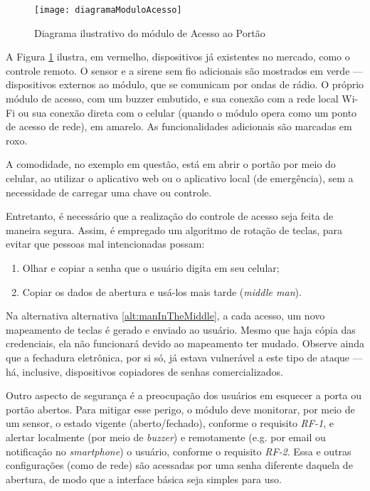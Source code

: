 \begin{figure}[H]
	\centering
	\caption{Diagrama ilustrativo do módulo de Acesso ao Portão}
  \texttt{[image: diagramaModuloAcesso]}
\label{fig:diagramaModuloAcesso}
\end{figure}

A Figura \ref{fig:diagramaModuloAcesso} ilustra, em vermelho, dispositivos já existentes no mercado, como o controle remoto. O sensor e a sirene sem fio adicionais são mostrados em verde --- dispositivos externos ao módulo, que se comunicam por ondas de rádio. O próprio módulo de acesso, com um buzzer embutido, e sua conexão com a rede local Wi-Fi ou sua conexão direta com o celular (quando o módulo opera como um ponto de acesso de rede), em amarelo. As funcionalidades adicionais são marcadas em roxo.

A comodidade, no exemplo em questão, está em abrir o portão por meio do celular, ao utilizar o aplicativo web ou o aplicativo local (de emergência), sem a necessidade de carregar uma chave ou controle.

Entretanto, é necessário que a realização do controle de acesso seja feita de maneira segura. Assim, é empregado um algoritmo de rotação de teclas, para evitar que pessoas mal intencionadas possam:

\begin{enumerate}
	\item Olhar e copiar a senha que o usuário digita em seu celular;
	\item \label{alt:manInTheMiddle} Copiar os dados de abertura e usá-los mais tarde (\textit{middle man}).
\end{enumerate}

Na alternativa alternativa \ref{alt:manInTheMiddle}, a cada acesso, um novo mapeamento de teclas é gerado e enviado ao usuário. Mesmo que haja cópia das credenciais, ela não funcionará devido ao mapeamento ter mudado. Observe ainda que a fechadura eletrônica, por si só, já estava vulnerável a este tipo de ataque --- há, inclusive, dispositivos copiadores de senhas comercializados.

Outro aspecto de segurança é a preocupação dos usuários em esquecer a porta ou portão abertos. Para mitigar esse perigo, o módulo deve monitorar, por meio de um sensor, o estado vigente (aberto/fechado), conforme o requisito \emph{RF-1}, e alertar localmente (por meio de \textit{buzzer}) e remotamente (e.g. por email ou notificação no \textit{smartphone}) o usuário, conforme o requisito \emph{RF-2}. Essa e outras configurações (como de rede) são acessadas por uma senha diferente daquela de abertura, de modo que a interface básica seja simples para uso.

